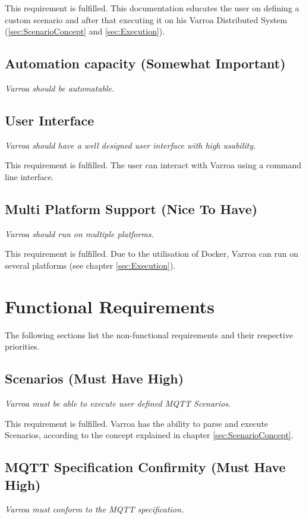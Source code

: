This requirement is fulfilled. This documentation educates the user on defining a custom scenario and after that executing it on his Varroa Distributed System (\ref{sec:ScenarioConcept} and \ref{sec:Execution}).

\subsection{Automation capacity (Somewhat Important)} 
\emph{Varroa should be automatable.}


\subsection{User Interface}
\emph{Varroa should have a well designed user interface with high usability.}

This requirement is fulfilled.
The user can interact with Varroa using a command line interface.

\subsection{Multi Platform Support (Nice To Have)}
\emph{Varroa should run on multiple platforms.}

This requirement is fulfilled.
Due to the utilisation of Docker, Varroa can run on several platforms (see chapter \ref{sec:Execution}).

\section{Functional Requirements}
The following sections list the non-functional requirements and their respective priorities.

\subsection{Scenarios (Must Have High)}
\emph{Varroa must be able to execute user defined MQTT Scenarios.}

This requirement is fulfilled.
Varroa has the ability to parse and execute Scenarios, according to the concept explained in chapter \ref{sec:ScenarioConcept}.

\subsection{MQTT Specification Confirmity (Must Have High)}
\emph{Varroa must conform to the MQTT specification.}

